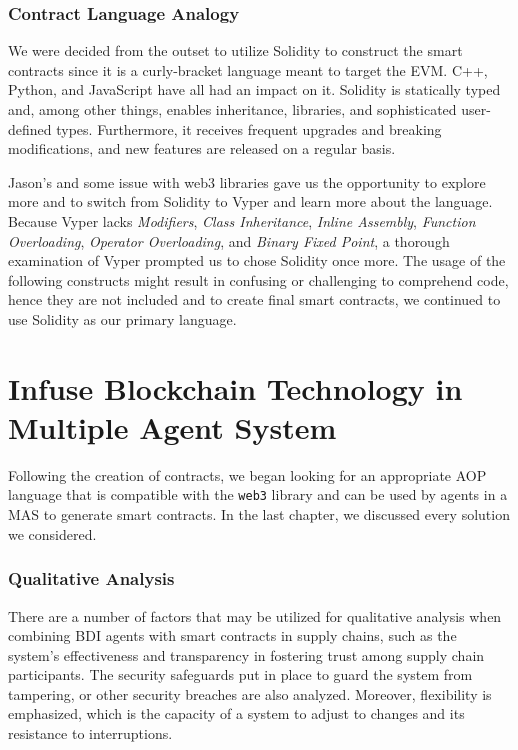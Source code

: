 \subsubsection{Contract Language Analogy}

We were decided from the outset to utilize Solidity to construct the smart contracts since it is a curly-bracket language meant to target the \ac{EVM}. C++, Python, and JavaScript have all had an impact on it. Solidity is statically typed and, among other things, enables inheritance, libraries, and sophisticated user-defined types. Furthermore, it receives frequent upgrades and breaking modifications, and new features are released on a regular basis. 

\vspace{.5cm}

Jason's and some issue with web3 libraries gave us the opportunity to explore more and to switch from Solidity to Vyper and learn more about the language. Because Vyper lacks \textit{Modifiers}, \textit{Class Inheritance}, \textit{Inline Assembly}, \textit{Function Overloading}, \textit{Operator Overloading}, and \textit{Binary Fixed Point}, a thorough examination of Vyper prompted us to chose Solidity once more. The usage of the following constructs might result in confusing or challenging to comprehend code, hence they are not included and to create final smart contracts, we continued to use Solidity as our primary language.


\section{Infuse Blockchain Technology in Multiple Agent System}

Following the creation of contracts, we began looking for an appropriate \ac{AOP} language that is compatible with the \texttt{web3} library and can be used by agents in a \ac{MAS} to generate smart contracts. In the last chapter, we discussed every solution we considered. 

\subsubsection{Qualitative Analysis}

There are a number of factors that may be utilized for qualitative analysis when combining \ac{BDI} agents with smart contracts in supply chains, such as the system's effectiveness and transparency in fostering trust among supply chain participants. The security safeguards put in place to guard the system from tampering, or other security breaches are also analyzed. Moreover, flexibility is emphasized, which is the capacity of a system to adjust to changes and its resistance to interruptions.

